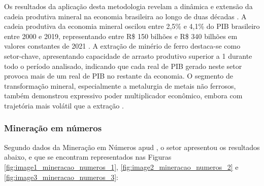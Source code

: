 Os resultados da aplicação desta metodologia revelam a dinâmica e extensão da cadeia produtiva mineral na economia brasileira ao longo de duas décadas \cite{leao2023}. A cadeia produtiva da economia mineral oscilou entre 2,5\% e 4,1\% do PIB brasileiro entre 2000 e 2019, representando entre R\$ 150 bilhões e R\$ 340 bilhões em valores constantes de 2021 \cite{apc2024}. A extração de minério de ferro destaca-se como setor-chave, apresentando capacidade de arrasto produtivo superior a 1 durante todo o período analisado, indicando que cada real de PIB gerado neste setor provoca mais de um real de PIB no restante da economia. O segmento de transformação mineral, especialmente a metalurgia de metais não ferrosos, também demonstrou expressivo poder multiplicador econômico, embora com trajetória mais volátil que a extração \cite{leao2023}.

\subsubsection{Mineração em números}
\label{subsubsec:mineracao_numeros}

Segundo dados da Mineração em Números \cite{ibram2023coletiva} apud \cite{fonseca2024resultados}, o setor apresentou os resultados abaixo, e que se encontram
representados nas Figuras \ref{fig:image1_mineracao_numeros_1}, \ref{fig:image2_mineracao_numeros_2} e \ref{fig:image3_mineracao_numeros_3}:

